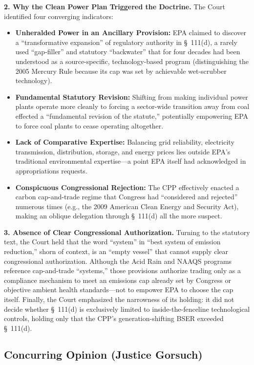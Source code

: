 \documentclass[12pt]{article}
\begin{document}
\textbf{2. Why the Clean Power Plan Triggered the Doctrine.} The Court identified four converging indicators:
\begin{itemize}
  \item \textbf{Unheralded Power in an Ancillary Provision:} EPA claimed to discover a ``transformative expansion'' of regulatory authority in \S~111(d), a rarely used ``gap-filler'' and statutory ``backwater'' that for four decades had been understood as a source-specific, technology-based program (distinguishing the 2005 Mercury Rule because its cap was set by achievable wet-scrubber technology).
  \item \textbf{Fundamental Statutory Revision:} Shifting from making individual power plants operate more cleanly to forcing a sector-wide transition away from coal effected a ``fundamental revision of the statute,'' potentially empowering EPA to force coal plants to cease operating altogether.
  \item \textbf{Lack of Comparative Expertise:} Balancing grid reliability, electricity transmission, distribution, storage, and energy prices lies outside EPA's traditional environmental expertise---a point EPA itself had acknowledged in appropriations requests.
  \item \textbf{Conspicuous Congressional Rejection:} The CPP effectively enacted a carbon cap-and-trade regime that Congress had ``considered and rejected'' numerous times (e.g., the 2009 American Clean Energy and Security Act), making an oblique delegation through \S~111(d) all the more suspect.
\end{itemize}

\textbf{3. Absence of Clear Congressional Authorization.} Turning to the statutory text, the Court held that the word ``system'' in ``best system of emission reduction,'' shorn of context, is an ``empty vessel'' that cannot supply clear congressional authorization. Although the Acid Rain and NAAQS programs reference cap-and-trade ``systems,'' those provisions authorize trading only as a compliance mechanism to meet an emissions cap already set by Congress or objective ambient health standards---not to empower EPA to choose the cap itself. Finally, the Court emphasized the narrowness of its holding: it did not decide whether \S~111(d) is exclusively limited to inside-the-fenceline technological controls, holding only that the CPP's generation-shifting BSER exceeded \S~111(d).

\subsection{Concurring Opinion (Justice Gorsuch)}
\end{document}
